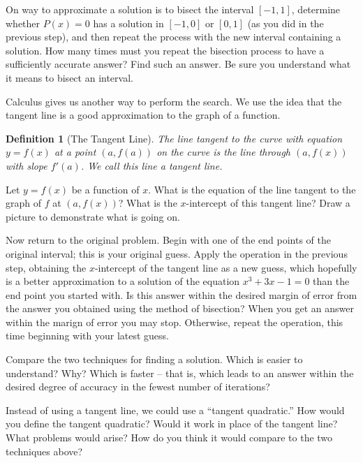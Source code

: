 \documentclass
[justified,nohyper]
{tufte-handout}
\theoremstyle{mydef}
\newtheorem{definition}{Definition}
\begin{document}
On way to approximate a solution is to bisect the interval $[-1,1]$, determine whether $P(x)=0$ has a solution in $[-1,0]$ or $[0,1]$ (as you did in the previous step), and then repeat the process with the new interval containing a solution. How many times must you repeat the bisection process to have a sufficiently accurate answer? Find such an answer. Be sure you understand what it means to bisect an interval.

Calculus gives us another way to perform the search. We use the idea that the tangent line is a good approximation to the graph of a function.

\begin{definition}[The Tangent Line]
The line tangent to the curve with equation $y=f(x)$ at a point $\left(a,f(a)\right)$ on the curve is the line through $\left(a,f(x)\right)$ with slope $f'(a)$. We call this line a tangent line.
\end{definition}

Let $y=f(x)$ be a function of $x$. What is the equation of the line tangent to the graph of $f$ at $\left(a,f(x)\right)$? What is the $x$-intercept of this tangent line? Draw a picture to demonstrate what is going on.

Now return to the original problem. Begin with one of the end points of the original interval; this is your original guess. Apply the operation in the previous step, obtaining the $x$-intercept of the tangent line as a new guess, which hopefully is a better approximation to a solution of the equation $x^3+3x-1=0$ than the end point you started with. Is this answer within the desired margin of error from the answer you obtained using the method of bisection? When you get an answer within the marign of error you may stop. Otherwise, repeat the operation, this time beginning with your latest guess.

Compare the two techniques for finding a solution. Which is easier to understand? Why? Which is faster -- that is, which leads to an answer within the desired degree of accuracy in the fewest number of iterations?

Instead of using a tangent line, we could use a ``tangent quadratic.'' How would you define the tangent quadratic? Would it work in place of the tangent line? What problems would arise? How do you think it would compare to the two techniques above?  
\end{document}
